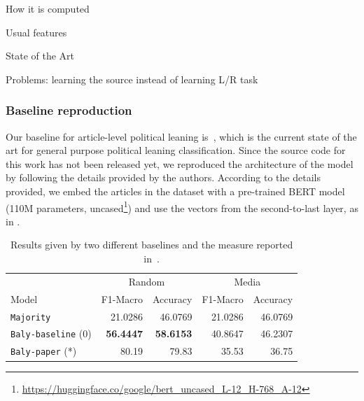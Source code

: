 How it is computed

Usual features

State of the Art

Problems: learning the source instead of learning L/R task


\subsubsection{\statusgreen Baseline reproduction}
\label{ssec:ps_leaning_classifier}









Our baseline for article-level political leaning is~\citet{baly2020we}, which is the current state of the art for general purpose political leaning classification.
Since the source code for this work has not been released yet, we reproduced the architecture of the model by following the details provided by the authors. %
According to the details provided, we embed the articles in the dataset with a pre-trained BERT model (110M parameters, uncased\footnote{\url{https://huggingface.co/google/bert_uncased_L-12_H-768_A-12}}) and use the vectors from the second-to-last layer, as in \citet{baly2020we}. %

\begin{table}[!htbp]
    \centering
   \scriptsize
    \begin{tabular}{l|rr|rr}
        & \multicolumn{2}{c}{Random} & \multicolumn{2}{c}{Media} \\
        Model & F1-Macro & Accuracy & F1-Macro & Accuracy \\
        \hline
        \texttt{Majority} & 21.0286 & 46.0769 & 21.0286 & 46.0769 \\
        \texttt{Baly-baseline} (0) & \textbf{56.4447} & \textbf{58.6153} & 40.8647 & 46.2307 \\
        \texttt{Baly-paper} (*) & 80.19 & 79.83 & 35.53 & 36.75 \\
    \end{tabular}
    \caption{Results given by two different baselines and the measure reported in~\citet{baly2020we}.}
    \label{tab:results_baselines_classifier}
\end{table}

